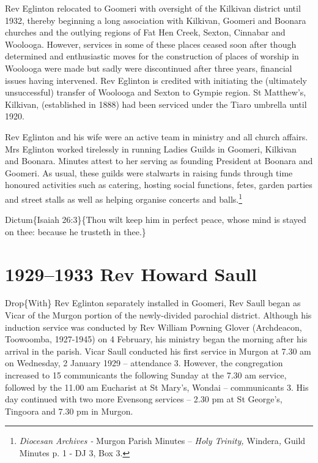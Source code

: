 Rev Eglinton relocated to Goomeri with oversight of the Kilkivan district until 1932, thereby beginning a long association with Kilkivan, Goomeri and Boonara churches and the outlying regions of Fat Hen Creek, Sexton, Cinnabar and Woolooga. However, services in some of these places ceased soon after though determined and enthusiastic moves for the construction of places of worship in Woolooga were made but sadly were discontinued after three years, financial issues having intervened. Rev Eglinton is credited with initiating the (ultimately unsuccessful) transfer of Woolooga and Sexton to Gympie region. St Matthew's, Kilkivan, (established in 1888) had been serviced under the Tiaro umbrella until 1920.

Rev Eglinton and his wife were an active team in ministry and all church affairs. Mrs Eglinton worked tirelessly in running Ladies Guilds in Goomeri, Kilkivan and Boonara. Minutes attest to her serving as founding President at Boonara and Goomeri. As usual, these guilds were stalwarts in raising funds through time honoured activities such as catering, hosting social functions, fetes, garden parties and street stalls as well as helping organise concerts and balls.\footnote{\emph{Diocesan Archives -} Murgon Parish Minutes -- \emph{Holy Trinity,} Windera\emph{,} Guild Minutes p. 1 - DJ 3, Box 3.}

Dictum\{Isaiah 26:3\}\{Thou wilt keep him in perfect peace, whose mind is stayed on thee: because he trusteth in thee.\}

\hypertarget{rev-howard-saull}{%
\chapter{1929--1933 Rev Howard Saull}\label{rev-howard-saull}}

Drop\{With\} Rev Eglinton separately installed in Goomeri, Rev Saull began as Vicar of the Murgon portion of the newly-divided parochial district. Although his induction service was conducted by Rev William Powning Glover (Archdeacon, Toowoomba, 1927-1945) on 4 February, his ministry began the morning after his arrival in the parish. Vicar Saull conducted his first service in Murgon at 7.30 am on Wednesday, 2 January 1929 -- attendance 3. However, the congregation increased to 15 communicants the following Sunday at the 7.30 am service, followed by the 11.00 am Eucharist at St Mary's, Wondai -- communicants 3. His day continued with two more Evensong services -- 2.30 pm at St George's, Tingoora and 7.30 pm in Murgon.

